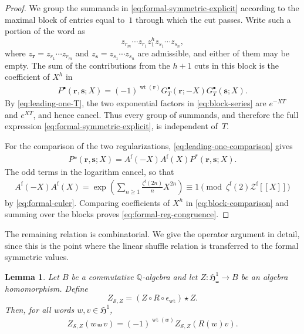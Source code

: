 \documentclass[12pt]{amsart}
\numberwithin{equation}{section}
\theoremstyle{plain}
\newtheorem{lem}[lem]{Lemma}
\newcommand{\QQ}{\mathbb{Q}}
\DeclareMathOperator{\wt}{wt}
\newcommand{\h}{\mathfrak H}
\newcommand{\Zf}{{\mathcal Z^{\mathrm f}}}
\newcommand{\zf}[1]{\zeta^{\mathrm f}(#1)}
\begin{document}
\begin{proof}
We group the summands in \eqref{eq:formal-symmetric-explicit} according to the maximal block of entries equal to~$1$ through which the cut passes. Write such a portion of the word as
\[
 z_{r_m}\cdots z_{r_1}z_1^h z_{s_1}\cdots z_{s_n},
\]
where $z_{\boldsymbol r}=z_{r_1}\cdots z_{r_m}$ and
$z_{\boldsymbol s}=z_{s_1}\cdots z_{s_n}$ are admissible, and either of them may be empty. The sum of the contributions from the $h+1$ cuts in this block is the coefficient of $X^h$ in
\begin{align}\label{eq:block-series}
 P^\bullet(\boldsymbol r,\boldsymbol s;X)
 =(-1)^{\wt(\boldsymbol r)}
 G_T^\bullet(\boldsymbol r;-X)G_T^\bullet(\boldsymbol s;X).
\end{align}
By \eqref{eq:leading-one-T}, the two exponential factors in \eqref{eq:block-series} are $e^{-XT}$ and $e^{XT}$, and hence cancel. Thus every group of summands, and therefore the full expression \eqref{eq:formal-symmetric-explicit}, is independent of~$T$.

For the comparison of the two regularizations, \eqref{eq:leading-one-comparison} gives
\begin{align}\label{eq:block-comparison}
 P^\shuffle(\boldsymbol r,\boldsymbol s;X)
 =A^{\mathrm f}(-X)A^{\mathrm f}(X)
 P^*(\boldsymbol r,\boldsymbol s;X).
\end{align}
The odd terms in the logarithm cancel, so that
\begin{align}\label{eq:A-even-factor}
 A^{\mathrm f}(-X)A^{\mathrm f}(X)
 =\exp\left(\sum_{n\geq1}\frac{\zf{2n}}{n}X^{2n}\right)
 \equiv1\pmod{\zf{2}\Zf[[X]]}
\end{align}
by \eqref{eq:formal-euler}. Comparing coefficients of $X^h$ in \eqref{eq:block-comparison} and summing over the blocks proves \eqref{eq:formal-reg-congruence}.
\end{proof}

The remaining relation is combinatorial. We give the operator argument in detail, since this is the point where the linear shuffle relation is transferred to the formal symmetric values.

\begin{lem}\label{lem:cut-shuffle}
Let $B$ be a commutative $\QQ$-algebra and let
$Z:\h^1_\shuffle\to B$ be an algebra homomorphism. Define
\[
 Z_{\mathcal S,Z}=(Z\circ R\circ\epsilon_{\wt})\star Z.
\]
Then, for all words $w,v\in\h^1$,
\begin{align}\label{eq:abstract-linear-shuffle}
 Z_{\mathcal S,Z}(w\shuffle v)
 =(-1)^{\wt(w)}Z_{\mathcal S,Z}(R(w)v).
\end{align}
\end{lem}
\end{document}
